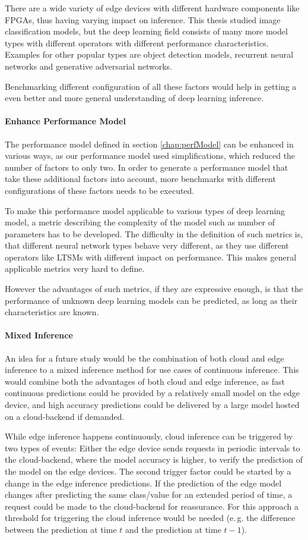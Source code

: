 There are a wide variety of edge devices with different hardware components like FPGAs, thus having varying impact on inference.
This thesis studied image classification models, but the deep learning field consists of many more model types with different operators with different performance characteristics.
Examples for other popular types are object detection models, recurrent neural networks and generative adversarial networks.

Benchmarking different configuration of all these factors would help in getting a even better and more general understanding of deep learning inference.

\paragraph{Enhance Performance Model}
The performance model defined in section \ref{chap:perfModel} can be enhanced in various ways, as our performance model used simplifications, which reduced the number of factors to only two.
In order to generate a performance model that take these additional factors into account, more benchmarks with different configurations of these factors needs to be executed.

To make this performance model applicable to various types of deep learning model, a metric describing the complexity of the model such as number of parameters has to be developed.
The difficulty in the definition of such metrics is, that different neural network types behave very different, as they use different operators like LTSMs with different impact on performance. 
This makes general applicable metrics very hard to define.

However the advantages of such metrics, if they are expressive enough, is that the performance of unknown deep learning models can be predicted, as long as their characteristics are known.
\paragraph{Mixed Inference}
An idea for a future study would be the combination of both cloud and edge inference to a mixed inference method for use cases of continuous inference.
This would combine both the advantages of both cloud and edge inference, as fast continuous predictions could be provided by a relatively small model on the edge device, and high accuracy predictions could be delivered by a large model hosted on a cloud-backend if demanded. 

While edge inference happens continuously, cloud inference can be triggered by two types of events:
Either the edge device sends requests in periodic intervals to the cloud-backend, where the model accuracy is higher, to verify the prediction of the model on the edge devices.
The second trigger factor could be started by a change in the edge inference predictions. If the prediction of the edge model changes after predicting the same class/value for an extended period of time, a request could be made to the cloud-backend for reassurance. For this approach a threshold for triggering the cloud inference would be needed (e.\,g. the difference between the prediction at time $t$ and the prediction at time $t-1$).




